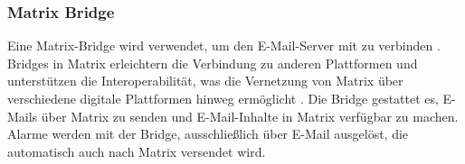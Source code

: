 \subsubsection{Matrix Bridge}
Eine Matrix-Bridge wird verwendet, um den E-Mail-Server mit  zu verbinden \cite{jojii_jojiiofficialmatrix-emailbridge_2024}. Bridges in Matrix erleichtern die Verbindung zu anderen Plattformen und unterstützen die Interoperabilität, was die Vernetzung von Matrix über verschiedene digitale Plattformen hinweg ermöglicht \cite{noauthor_bridges_nodate}. Die Bridge gestattet es, E-Mails über Matrix zu senden und E-Mail-Inhalte in Matrix verfügbar zu machen. Alarme werden mit der Bridge, ausschließlich über E-Mail ausgelöst, die automatisch auch nach Matrix versendet wird.
